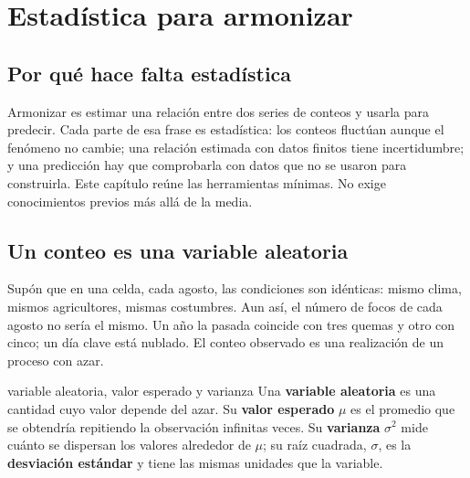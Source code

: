 \chapter{Estadística para armonizar}\label{cap:estadistica}


\section{Por qué hace falta estadística}

Armonizar es estimar una relación entre dos series de conteos y usarla para predecir. Cada
parte de esa frase es estadística: los conteos fluctúan aunque el fenómeno no cambie; una
relación estimada con datos finitos tiene incertidumbre; y una predicción hay que comprobarla
con datos que no se usaron para construirla. Este capítulo reúne las herramientas mínimas. No
exige conocimientos previos más allá de la media.

\section{Un conteo es una variable aleatoria}

Supón que en una celda, cada agosto, las condiciones son idénticas: mismo clima, mismos
agricultores, mismas costumbres. Aun así, el número de focos de cada agosto no sería el mismo.
Un año la pasada coincide con tres quemas y otro con cinco; un día clave está nublado. El conteo
observado es una realización de un proceso con azar.

\begin{definicion}{variable aleatoria, valor esperado y varianza}
Una \textbf{variable aleatoria} es una cantidad cuyo valor depende del azar. Su \textbf{valor
esperado} $\mu$ es el promedio que se obtendría repitiendo la observación infinitas veces. Su
\textbf{varianza} $\sigma^2$ mide cuánto se dispersan los valores alrededor de $\mu$; su raíz
cuadrada, $\sigma$, es la \textbf{desviación estándar} y tiene las mismas unidades que la
variable.
\end{definicion}

